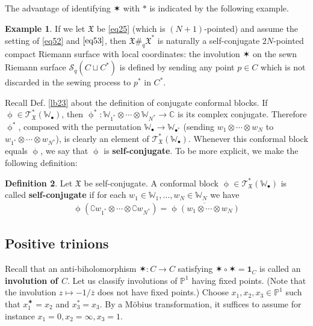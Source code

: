 \documentclass[11pt,b5paper,notitlepage]{article}
\theoremstyle{definition}
\newtheorem{df}{Definition}[section]
\newtheorem{eg}[df]{Example}
\theoremstyle{plain}
\newcommand{\fk}{\mathfrak}
\newcommand{\mc}{\mathcal}
\newcommand{\ovl}{\overline}
\newcommand{\id}{\mathbf{1}}
\newcommand{\scr}{\mathscr}
\newcommand{\Co}{\complement}
\newcommand{\blt}{\bullet}
\newcommand{\Wbb}{\mathbb W}
\newcommand{\Cbb}{\mathbb C}
\newcommand{\Pbb}{\mathbb P}
\numberwithin{equation}{section}
\begin{document}
The advantage of identifying $\varstar$ with $*$ is indicated by the following example.

\begin{eg}
If we let $\fk X$ be \eqref{eq25} (which is $(N+1)$-pointed) and assume the setting of \eqref{eq52} and $\eqref{eq53}$, then $\fk X\#_q\fk X^*$ is naturally a self-conjugate $2N$-pointed compact Riemann surface with local coordinates: the involution $\varstar$ on the sewn Riemann surface $\mc S_q(C\sqcup C^*)$ is defined by sending any point $p\in C$ which is not discarded in the sewing process to $p^*$ in $C^*$.
\end{eg}



Recall Def. \ref{lb23} about the definition of conjugate conformal blocks. If $\upphi\in\scr T_{\fk X}^*(\Wbb_\blt)$, then $\upphi^*:\Wbb_{1^*}\otimes\cdots\otimes\Wbb_{N^*}\rightarrow\Cbb$ is its complex conjugate. Therefore $\upphi^*$, composed with the permutation $\Wbb_\blt\rightarrow\Wbb_{\blt^*}$ (sending $w_1\otimes\cdots\otimes w_N$ to $w_{1^*}\otimes\cdots\otimes w_{N^*}$), is clearly an element of $\scr T_{\fk X}^*(\Wbb_\blt)$. Whenever this conformal block equals $\upphi$, we say that $\upphi$ is \textbf{self-conjugate}. To be more explicit, we make the following definition:


\begin{df}\label{lb67}
Let $\fk X$ be self-conjugate. A conformal block $\upphi\in\scr T_{\fk X}^*(\Wbb_\blt)$ is called \textbf{self-conjugate} if for each $w_1\in\Wbb_1,\dots,w_N\in\Wbb_N$ we have
\begin{align}
\upphi(\Co w_{1^*}\otimes \cdots\otimes\Co w_{N^*})=\ovl{\upphi(w_1\otimes\cdots\otimes w_N)} 
\end{align}
\end{df}



\subsection{Positive trinions}

Recall that an anti-biholomorphism $\varstar:C\rightarrow C$ satisfying $\varstar\circ \varstar=\id_C$ is called an \textbf{involution  of $C$}. Let us classify involutions of $\Pbb^1$ having fixed points. (Note that the involution $z\mapsto -1/\ovl z$ does not have fixed points.) Choose $x_1,x_2,x_3\in\Pbb^1$ such that $x_1^\varstar=x_2$ and $x_3^*=x_3$. By a M\"obius transformation, it suffices to assume for instance $x_1=0,x_2=\infty,x_3=1$.
\end{document}
